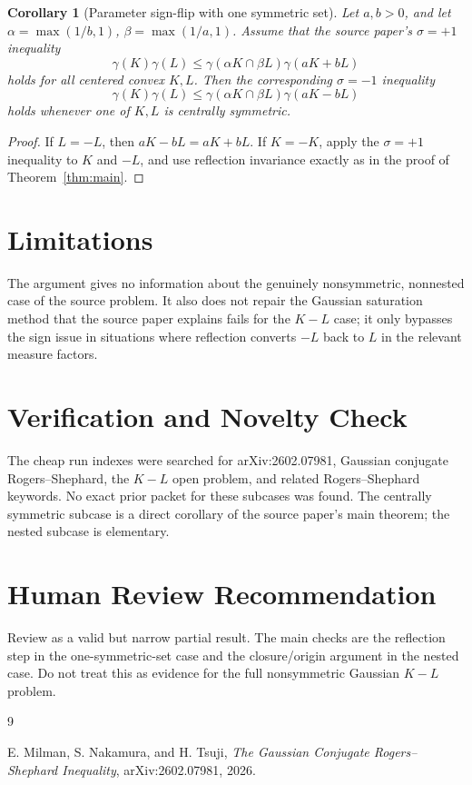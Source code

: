 \documentclass[11pt]{article}
\newtheorem{corollary}{Corollary}
\newcommand{\gauss}{\gamma}
\begin{document}
\begin{corollary}[Parameter sign-flip with one symmetric set]\label{cor:param}
Let \(a,b>0\), and let \(\alpha=\max(1/b,1)\), \(\beta=\max(1/a,1)\).
Assume that the source paper's \(\sigma=+1\) inequality
\[
  \gauss(K)\gauss(L)
  \leq \gauss(\alpha K\cap \beta L)\gauss(aK+bL)
\]
holds for all centered convex \(K,L\).  Then the corresponding
\(\sigma=-1\) inequality
\[
  \gauss(K)\gauss(L)
  \leq \gauss(\alpha K\cap \beta L)\gauss(aK-bL)
\]
holds whenever one of \(K,L\) is centrally symmetric.
\end{corollary}

\begin{proof}
If \(L=-L\), then \(aK-bL=aK+bL\).  If \(K=-K\), apply the \(\sigma=+1\)
inequality to \(K\) and \(-L\), and use reflection invariance exactly as in
the proof of Theorem~\ref{thm:main}.
\end{proof}

\section*{Limitations}

The argument gives no information about the genuinely nonsymmetric,
nonnested case of the source problem.  It also does not repair the Gaussian
saturation method that the source paper explains fails for the \(K-L\) case;
it only bypasses the sign issue in situations where reflection converts
\(-L\) back to \(L\) in the relevant measure factors.

\section*{Verification and Novelty Check}

The cheap run indexes were searched for arXiv:2602.07981, Gaussian conjugate
Rogers--Shephard, the \(K-L\) open problem, and related Rogers--Shephard
keywords.  No exact prior packet for these subcases was found.  The
centrally symmetric subcase is a direct corollary of the source paper's main
theorem; the nested subcase is elementary.

\section*{Human Review Recommendation}

Review as a valid but narrow partial result.  The main checks are the
reflection step in the one-symmetric-set case and the closure/origin argument
in the nested case.  Do not treat this as evidence for the full nonsymmetric
Gaussian \(K-L\) problem.

\begin{thebibliography}{9}

E. Milman, S. Nakamura, and H. Tsuji,
\emph{The Gaussian Conjugate Rogers--Shephard Inequality},
arXiv:2602.07981, 2026.

\end{thebibliography}
\end{document}
